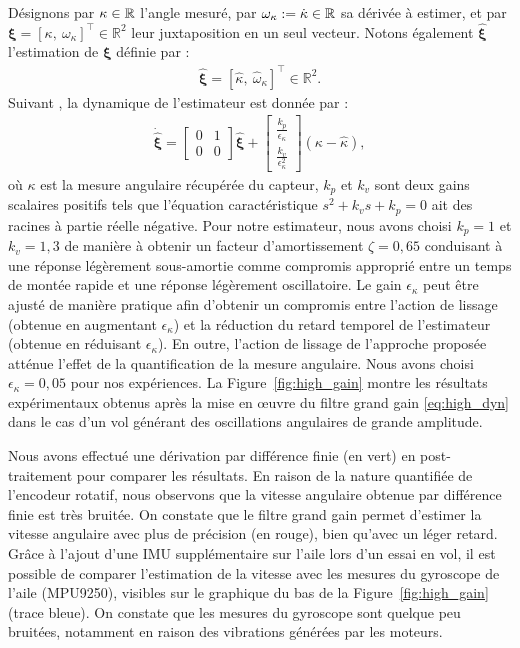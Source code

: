 Désignons par $\kappa \in {\mathbb R}$ l'angle mesuré, par $\omega_{\kappa} := \dot \kappa  \in {\mathbb R}$ sa dérivée à estimer, et par $\boldsymbol{\xi} = [\kappa,~\omega_{\kappa}]^\top \in \mathbb{R}^2$ leur juxtaposition en un seul vecteur. Notons également $\hat{\boldsymbol{\xi}}$ l'estimation de $\boldsymbol{\xi}$ définie par :
\begin{align*}
    \hat{\boldsymbol{\xi}} = [\hat{\kappa},~\hat{\omega}_{\kappa}]^\top \in \mathbb{R}^2.
\end{align*}
Suivant \cite{203613}, la dynamique de l'estimateur est donnée par :
\begin{align}
\label{eq:high_dyn}
    \dot{\hat{\boldsymbol{\xi}}} =  \begin{bmatrix}0 & 1 \\ 0 & 0 \end{bmatrix} \hat{\boldsymbol{\xi}}+ \begin{bmatrix}\frac{k_{p}}{\epsilon_{\kappa}}  \\ \frac{k_{v}}{\epsilon_{\kappa}^{2}}  \end{bmatrix} (\kappa - \hat{\kappa}),
\end{align}
où $\kappa$ est la mesure angulaire récupérée du capteur, $k_{p}$ et $k_{v}$ sont deux gains scalaires positifs tels que l'équation caractéristique $s^{2} + k_{v} s + k_{p} = 0$ ait des racines à partie réelle négative. Pour notre estimateur, nous avons choisi $k_{p} = 1$ et $k_{v} = 1,3$ de manière à obtenir un facteur d'amortissement $\zeta = 0,65$ conduisant à une réponse légèrement sous-amortie comme compromis approprié entre un temps de montée rapide et une réponse légèrement oscillatoire. Le gain $\epsilon_{\kappa}$ peut être ajusté de manière pratique afin d'obtenir un compromis entre l'action de lissage (obtenue en augmentant $\epsilon_{\kappa}$) et la réduction du retard temporel
de l'estimateur (obtenue en réduisant $\epsilon_{\kappa}$). En outre, l'action de lissage de l'approche proposée atténue l'effet de la quantification de la mesure angulaire. Nous avons choisi $\epsilon_{\kappa} = 0,05$ pour nos expériences. La Figure~\ref{fig:high_gain} montre les résultats expérimentaux obtenus après la mise en œuvre du filtre grand gain \eqref{eq:high_dyn} dans le cas d'un vol générant des oscillations angulaires de grande amplitude.

Nous avons effectué une dérivation par différence finie (en vert) en post-traitement pour comparer les résultats. En raison de la nature quantifiée de l'encodeur rotatif, nous observons que la vitesse angulaire obtenue par différence finie est très bruitée. On constate que le filtre grand gain permet d'estimer la vitesse angulaire avec plus de précision (en rouge), bien qu'avec un léger retard. Grâce à l'ajout d'une IMU supplémentaire sur l'aile lors d'un essai en vol, il est possible de comparer l'estimation de la vitesse avec les mesures du gyroscope de l'aile (MPU9250), visibles sur le graphique du bas de la Figure~\ref{fig:high_gain} (trace bleue). On constate que les mesures du gyroscope sont quelque peu bruitées, notamment en raison des vibrations générées par les moteurs. 

